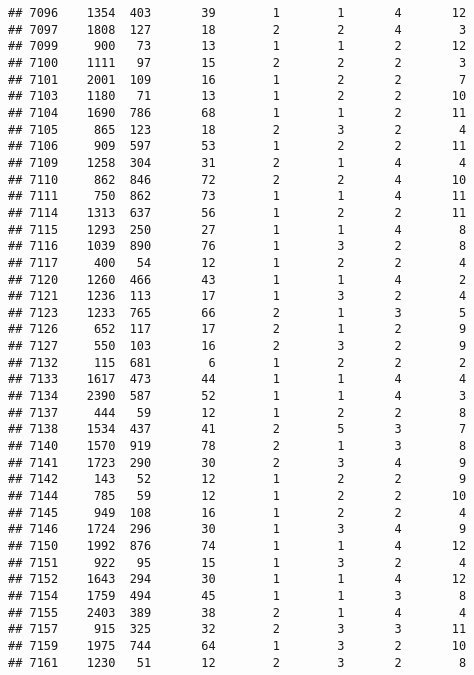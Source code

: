 \documentclass[]{article}
\begin{document}
\begin{verbatim}
## 7096    1354  403       39        1        1       4       12
## 7097    1808  127       18        2        2       4        3
## 7099     900   73       13        1        1       2       12
## 7100    1111   97       15        2        2       2        3
## 7101    2001  109       16        1        2       2        7
## 7103    1180   71       13        1        2       2       10
## 7104    1690  786       68        1        1       2       11
## 7105     865  123       18        2        3       2        4
## 7106     909  597       53        1        2       2       11
## 7109    1258  304       31        2        1       4        4
## 7110     862  846       72        2        2       4       10
## 7111     750  862       73        1        1       4       11
## 7114    1313  637       56        1        2       2       11
## 7115    1293  250       27        1        1       4        8
## 7116    1039  890       76        1        3       2        8
## 7117     400   54       12        1        2       2        4
## 7120    1260  466       43        1        1       4        2
## 7121    1236  113       17        1        3       2        4
## 7123    1233  765       66        2        1       3        5
## 7126     652  117       17        2        1       2        9
## 7127     550  103       16        2        3       2        9
## 7132     115  681        6        1        2       2        2
## 7133    1617  473       44        1        1       4        4
## 7134    2390  587       52        1        1       4        3
## 7137     444   59       12        1        2       2        8
## 7138    1534  437       41        2        5       3        7
## 7140    1570  919       78        2        1       3        8
## 7141    1723  290       30        2        3       4        9
## 7142     143   52       12        1        2       2        9
## 7144     785   59       12        1        2       2       10
## 7145     949  108       16        1        2       2        4
## 7146    1724  296       30        1        3       4        9
## 7150    1992  876       74        1        1       4       12
## 7151     922   95       15        1        3       2        4
## 7152    1643  294       30        1        1       4       12
## 7154    1759  494       45        1        1       3        8
## 7155    2403  389       38        2        1       4        4
## 7157     915  325       32        2        3       3       11
## 7159    1975  744       64        1        3       2       10
## 7161    1230   51       12        2        3       2        8

\end{verbatim}
\end{document}
